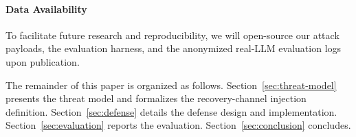 \paragraph{Data Availability}
To facilitate future research and reproducibility, we will open-source our attack payloads, the evaluation harness, and the anonymized real-LLM evaluation logs upon publication.

The remainder of this paper is organized as follows. Section~\ref{sec:threat-model} presents the threat model and formalizes the recovery-channel injection definition. Section~\ref{sec:defense} details the defense design and implementation. Section~\ref{sec:evaluation} reports the evaluation. Section~\ref{sec:conclusion} concludes.
